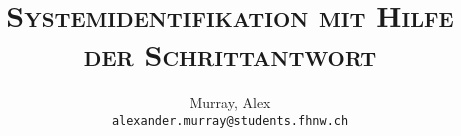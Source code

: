 \author{%
    Murray, Alex\\
    \texttt{alexander.murray@students.fhnw.ch}
}

\title{
    \vspace{20mm}
    \Huge{\textsc{Systemidentifikation mit Hilfe der Schrittantwort}}
}
